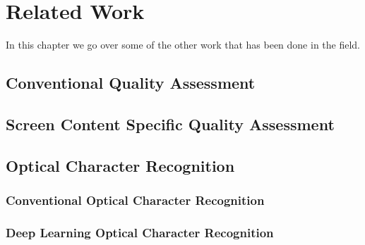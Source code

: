 \chapter{Related Work}
\label{chap:related_work}

In this chapter we go over some of the other work that has been done in the field.

\section{Conventional Quality Assessment}

\section{Screen Content Specific Quality Assessment}

\section{Optical Character Recognition}

\subsection{Conventional Optical Character Recognition}

\subsection{Deep Learning Optical Character Recognition}
